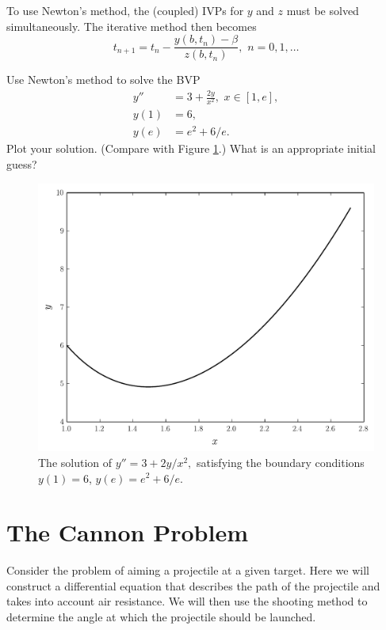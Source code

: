 To use Newton's method, the (coupled) IVPs for $y$ and $z$ must be solved simultaneously.
The iterative method then becomes
\[t_{n+1} = t_n - \frac{ y(b,t_n) - \beta}{z(b,t_n)}, \,\, n = 0,1,\hdots\]

\begin{problem}
Use Newton's method to solve the BVP
\begin{equation*}
\begin{split}
y'' &= 3 + \frac{2y}{x^2}, \,\, x \in [1,e],\\
y(1) &= 6, \\
y(e) &= e^2 + 6/e.
\end{split}
\end{equation*}
Plot your solution.
(Compare with Figure \ref{prob:shooting2}.)
What is an appropriate initial guess?

\begin{figure}[H]
\includegraphics[width=\textwidth]{Fig2.pdf}
\caption{The solution of  $y'' = 3 + 2y/x^2,$ satisfying the boundary conditions $y(1) = 6$, $ y(e) =  e^2 + 6/e$.}
\label{prob:shooting2}
\end{figure}
\end{problem}

\section*{The Cannon Problem}

Consider the problem of aiming a projectile at a given target.
Here we will construct a differential equation that describes the path of the projectile and takes into account air resistance.
We will then use the shooting method to determine the angle at which the projectile should be launched.


